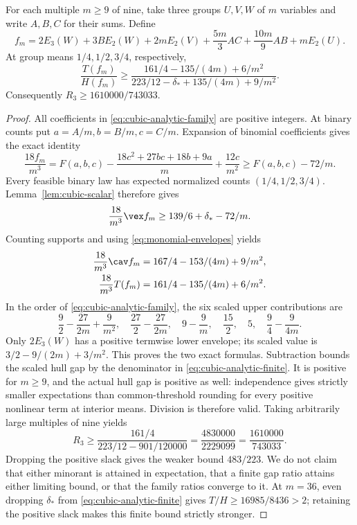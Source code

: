 \begin{theorem}\label{thm:cubic-analytic}
For each multiple $m\ge9$ of nine, take three groups $U,V,W$ of $m$
variables and write $A,B,C$ for their sums. Define
\begin{equation}\label{eq:cubic-analytic-family}
 f_m=2E_3(W)+3B E_2(W)+2mE_2(V)
       +\frac{5m}{3}AC+\frac{10m}{9}AB+mE_2(U).
\end{equation}
At group means $1/4,1/2,3/4$, respectively,
\begin{equation}\label{eq:cubic-analytic-finite}
 \frac{T(f_m)}{H(f_m)}\ge
 \frac{161/4-135/(4m)+6/m^2}
 {223/12-\delta_*+135/(4m)+9/m^2}.
\end{equation}
Consequently $R_3\ge1610000/743033$.
\end{theorem}
\begin{proof}
All coefficients in \eqref{eq:cubic-analytic-family} are positive integers.
At binary counts put $a=A/m,b=B/m,c=C/m$. Expansion of binomial
coefficients gives the exact identity
\begin{equation}\label{eq:cubic-count-expansion}
 \frac{18f_m}{m^3}=F(a,b,c)
 -\frac{18c^2+27bc+18b+9a}{m}+\frac{12c}{m^2}
 \ge F(a,b,c)-72/m.
\end{equation}
Every feasible binary law has expected normalized counts
$(1/4,1/2,3/4)$. Lemma~\ref{lem:cubic-scalar} therefore gives
\[
 \frac{18}{m^3}\vex f_m\ge139/6+\delta_*-72/m.
\]
Counting supports and using \eqref{eq:monomial-envelopes} yields
\begin{align}
 \frac{18}{m^3}\cav f_m&=167/4-153/(4m)+9/m^2,
       \label{eq:cubic-analytic-cav}\\
 \frac{18}{m^3}T(f_m)&=161/4-135/(4m)+6/m^2.
       \label{eq:cubic-analytic-tgap}
\end{align}
In the order of \eqref{eq:cubic-analytic-family}, the six scaled upper
contributions are
\[
 \frac92-\frac{27}{2m}+\frac9{m^2},\quad
 \frac{27}2-\frac{27}{2m},\quad
 9-\frac9m,\quad\frac{15}2,\quad5,\quad
 \frac94-\frac9{4m}.
\]
Only $2E_3(W)$ has a positive termwise lower envelope; its scaled value
is $3/2-9/(2m)+3/m^2$. This proves the two exact formulas. Subtraction
bounds the scaled hull gap by the denominator in
\eqref{eq:cubic-analytic-finite}. It is positive for $m\ge9$, and the
actual hull gap is positive as well: independence gives strictly smaller
expectations than common-threshold rounding for every positive nonlinear
term at interior means. Division is therefore valid. Taking arbitrarily
large multiples of nine yields
\[
 R_3\ge\frac{161/4}{223/12-901/120000}
       =\frac{4830000}{2229099}=\frac{1610000}{743033}.
\]
Dropping the positive slack gives the weaker bound $483/223$. We do not
claim that either minorant is attained in expectation, that a finite gap
ratio attains either limiting bound, or that the family ratios converge to
it.
At $m=36$, even dropping $\delta_*$ from
\eqref{eq:cubic-analytic-finite} gives $T/H\ge16985/8436>2$;
retaining the positive slack makes this finite bound strictly stronger.
\end{proof}

